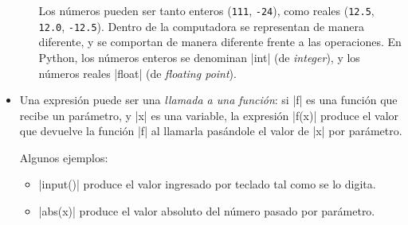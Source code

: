 \begin{itemize}
\begin{itemize}
\begin{observacion}
Los números pueden ser tanto enteros (\lstinline!111!, \lstinline!-24!), como
reales (\lstinline!12.5!, \lstinline!12.0!, \lstinline!-12.5!). Dentro de la
computadora se representan de manera diferente, y se comportan de manera
diferente frente a las operaciones. En Python, los números enteros se denominan
|int| (de {\it integer}), y los números reales |float| (de {\it floating
point}).
\end{observacion}

\end{itemize}

\item Una expresión puede ser una {\it llamada a una función}: si |f| es una
    función que recibe un parámetro, y |x| es una variable, la expresión |f(x)|
    produce el valor que devuelve la función |f| al llamarla pasándole el valor
    de |x| por parámetro.

    Algunos ejemplos:

\begin{itemize}
\item |input()| produce el valor ingresado por teclado tal como se lo digita.
\item |abs(x)| produce el valor absoluto del número pasado por parámetro.
\end{itemize}

\end{itemize}



